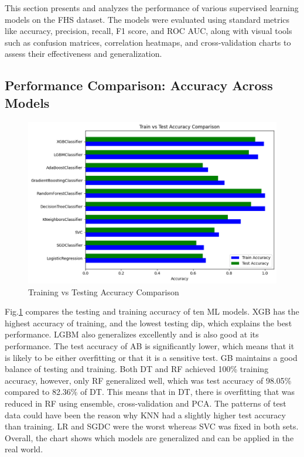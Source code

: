 \documentclass[conference]{IEEEtran}
\begin{document}
This section presents and analyzes the performance of various supervised learning models on the FHS dataset. The models were evaluated using standard metrics like accuracy, precision, recall, F1 score, and ROC AUC, along with visual tools such as confusion matrices, correlation heatmaps, and cross-validation charts to assess their effectiveness and generalization.

\subsection{\textbf{Performance Comparison: Accuracy Across Models}}

\begin{figure}[h]
\centerline{
\includegraphics[width=0.5 \textwidth]{Picture2.png}}
\caption{Training vs Testing Accuracy Comparison}
\label{fig:1}
\end{figure}

Fig.\ref{fig:1} compares the testing and training accuracy of ten ML models. XGB has the highest accuracy of training, and the lowest testing dip, which explains the best performance.  LGBM also generalizes excellently and is also good at its performance.  The test accuracy of AB is significantly lower, which means that it is likely to be either overfitting or that it is a sensitive test.  GB maintains a good balance of testing and training.  Both DT and RF achieved 100\% training accuracy, however, only RF generalized well, which was test accuracy of 98.05\% compared to 82.36\% of DT.  This means that in DT, there is overfitting that was reduced in RF using ensemble, cross-validation and PCA.  The patterns of test data could have been the reason why KNN had a slightly higher test accuracy than training.  LR and SGDC were the worst whereas SVC was fixed in both sets. Overall, the chart shows which models are generalized and can be applied in the real world.
\end{document}
